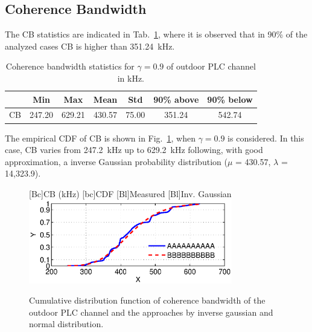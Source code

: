 \documentclass[journal]{IEEEtran}
\newcommand{\tamfig}{3.5in}    %
\begin{document}
	\subsection{Coherence Bandwidth}\label{sec-bandadecoerencia}
	
	The \ac{CB} statistics are indicated in Tab.~\ref{Tab:EstatisticasCB}, where it is observed that in 90\% of the analyzed cases  \ac{CB} is higher than 351.24~kHz.
	\begin{table}[!htb]
		\centering
		\caption{Coherence bandwidth statistics for $\gamma = 0.9$ of outdoor PLC channel in kHz.}
		\footnotesize 
		\begin{tabular}{c|c|c|c|c|c|c}
			\hline 
			&  Min    & Max    & Mean    & Std     & 90\% above   & 90\% below \\
			\hline 
			CB                & 247.20  & 629.21 &  430.57 & 75.00   & 351.24       & 542.74 \\
			\hline
		\end{tabular} \label{Tab:EstatisticasCB}
		\newline
	\end{table} 
	
	The empirical CDF of CB is shown in Fig.~\ref{Fig:BC_CDF}, when  $\gamma = 0.9$ is considered. In this case, CB varies from 247.2~kHz up to 629.2~kHz following, with good approximation, a inverse Gaussian probability distribution ($\mu$ = 430.57, $\lambda$ = 14,323.9).  
	\begin{figure}[!htp]
		\begin{centering}
			[Bc]{CB (kHz)}    
			[bc]{CDF}
			[Bl]{Measured}
			[Bl]{Inv. Gaussian}
			\includegraphics[width=\tamfig]{Figuras/BC_CDF.eps}
			\caption{Cumulative distribution function of coherence bandwidth of the outdoor PLC channel and the approaches by inverse gaussian and normal distribution.}
			\label{Fig:BC_CDF}
		\end{centering}
	\end{figure}
	
\end{document}
